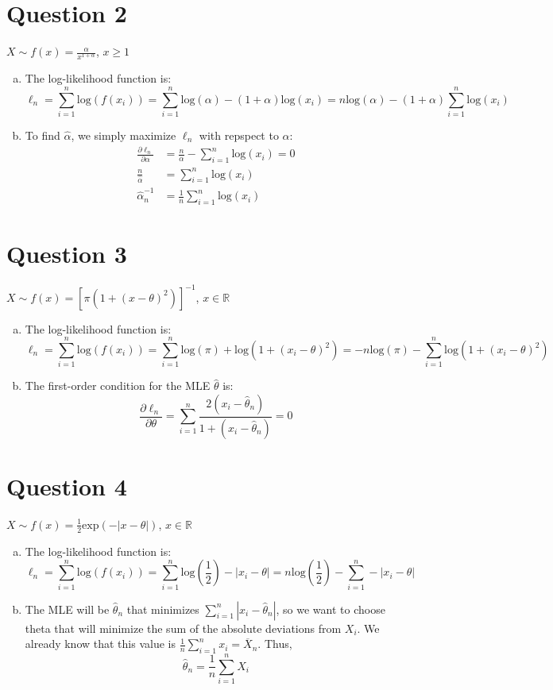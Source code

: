 \documentclass{article}
\newcommand{\R}{\mathbb{R}}
\newcommand{\olx}[1]{\overline{X}_{#1}}
\newcommand{\est}[1]{\frac{1}{#1}\sum_{i=1}^{#1}}
\newcommand{\sumn}{\sum_{i=1}^{n}}
\newcommand{\loge}[1]{\text{log}\left(#1\right)}
\begin{document}
\section*{Question 2}
$X\sim f(x)=\frac{\alpha}{x^{1+\alpha}}$, $x\geq 1$
\begin{enumerate}[(a)]
	\item The log-likelihood function is:
		\[
			\ell_n = \sum_{i=1}^n\loge{f(x_i)} = \sumn\loge{\alpha}-(1+\alpha)\loge{x_i} = n\loge{\alpha} - (1+\alpha)\sumn\loge{x_i}
		\]
		
	\item To find $\hat{\alpha}$, we simply maximize $\ell_n$ with repspect to $\alpha$:
		\begin{align*}
			\frac{\partial\ell_n}{\partial\alpha} &= \frac{n}{\alpha} - \sumn\loge{x_i} = 0 \\
			\frac{n}{\hat{\alpha}} &= \sumn\loge{x_i}	\\
			\hat{\alpha}_n^{-1} &= \frac{1}{n}\sumn\loge{x_i}
		\end{align*}
\end{enumerate}



\section*{Question 3}
$X\sim f(x)=\left[\pi(1+(x-\theta)^2)\right]^{-1}$, $x\in\R$
\begin{enumerate}[(a)]
	\item The log-likelihood function is:
		\[
			\ell_n = \sum_{i=1}^n\loge{f(x_i)} = \sumn\loge{\pi}+\loge{1+(x_i-\theta)^2} = -n\loge{\pi}-\sumn\loge{1+(x_i-\theta)^2}
		\]
		
	\item The first-order condition for the MLE $\hat{\theta}$ is:
		\[
			\frac{\partial\ell_n}{\partial\theta} = \sumn\frac{2(x_i-\hat{\theta}_n)}{1+(x_i-\hat{\theta}_n)}=0
		\]
\end{enumerate}



\section*{Question 4}
$X\sim f(x)=\frac{1}{2}\text{exp}(-|x-\theta|)$, $x\in\R$
\begin{enumerate}[(a)]
	\item The log-likelihood function is:
		\[
			\ell_n = \sum_{i=1}^n\loge{f(x_i)} = \sumn\loge{\frac{1}{2}}-|x_i-\theta| = n\loge{\frac{1}{2}}-\sumn-|x_i-\theta|
		\]
		
	\item The MLE will be $\hat{\theta}_n$ that minimizes $\sumn|x_i-\hat{\theta}_n|$, so we want to choose theta that will minimize the sum of the absolute deviations from $X_i$. We already know that this value is $\est{n}x_i=\olx{n}$. Thus,
		\[
			\hat{\theta}_n = \est{n}X_i
		\]
\end{enumerate}
\end{document}
